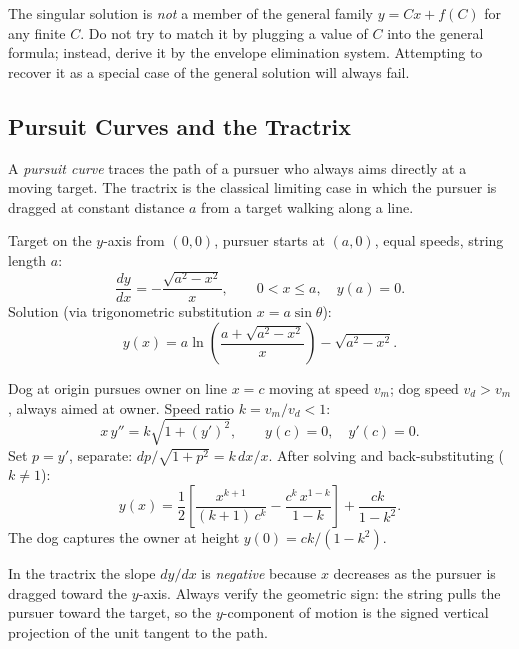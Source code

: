 \begin{warningbox}
The singular solution is \emph{not} a member of the general family $y = Cx + f(C)$
for any finite $C$. Do not try to match it by plugging a value of $C$ into the
general formula; instead, derive it by the envelope elimination system. Attempting
to recover it as a special case of the general solution will always fail.
\end{warningbox}

\subsection{Pursuit Curves and the Tractrix}

A \emph{pursuit curve} traces the path of a pursuer who always aims directly at
a moving target. The tractrix is the classical limiting case in which the
pursuer is dragged at constant distance $a$ from a target walking along a line.

\begin{formulabox}
Target on the $y$-axis from $(0,0)$, pursuer starts at $(a,0)$, equal speeds,
string length $a$:
\[
  \frac{dy}{dx} = -\frac{\sqrt{a^2 - x^2}}{x}, \qquad 0 < x \le a,\quad y(a) = 0.
\]
Solution (via trigonometric substitution $x = a\sin\theta$):
\[
  y(x) = a\ln\!\left(\frac{a + \sqrt{a^2 - x^2}}{x}\right) - \sqrt{a^2 - x^2}.
\]
\end{formulabox}

\begin{formulabox}
Dog at origin pursues owner on line $x = c$ moving at speed $v_m$; dog speed
$v_d > v_m$, always aimed at owner. Speed ratio $k = v_m/v_d < 1$:
\[
  x\,y'' = k\sqrt{1 + (y')^2}, \qquad y(c) = 0,\quad y'(c) = 0.
\]
Set $p = y'$, separate: $dp/\sqrt{1+p^2} = k\,dx/x$. After solving and
back-substituting ($k \ne 1$):
\[
  y(x) = \frac{1}{2}\!\left[\frac{x^{k+1}}{(k+1)\,c^{k}}
         - \frac{c^{k}\,x^{1-k}}{1-k}\right]
         + \frac{ck}{1 - k^2}.
\]
The dog captures the owner at height $y(0) = ck/(1-k^2)$.
\end{formulabox}

\begin{warningbox}
In the tractrix the slope $dy/dx$ is \emph{negative} because $x$ decreases as
the pursuer is dragged toward the $y$-axis. Always verify the geometric sign:
the string pulls the pursuer toward the target, so the $y$-component of motion
is the signed vertical projection of the unit tangent to the path.
\end{warningbox}

